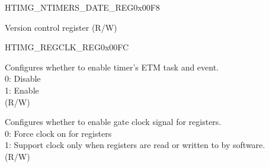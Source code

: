 \begin{register}{H}{TIMG\_NTIMERS\_DATE\_REG}{0x00F8}\label{regdesc:TIMGNTIMERSDATEREG}
%
%
\regnewline%
\begin{regdesc}\begin{reglist}
\label{fielddesc:TIMGNTIMGSDATE}\item [TIMG\_NTIMGS\_DATE] Version control register (R/W)
\end{reglist}\end{regdesc}
\end{register}


\begin{register}{H}{TIMG\_REGCLK\_REG}{0x00FC}\label{regdesc:TIMGREGCLKREG}
%
%
%
%
\regnewline%
\begin{regdesc}\begin{reglist}
\label{fielddesc:TIMGETMEN}\item [TIMG\_ETM\_EN] Configures whether to enable timer's ETM task and event. \\
0: Disable \\
1: Enable \\
(R/W)
\label{fielddesc:TIMGCLKEN}\item [TIMG\_CLK\_EN] Configures whether to enable gate clock signal for registers. \\
0: Force clock on for registers \\
1: Support clock only when registers are read or written to by software. \\
(R/W)
\end{reglist}\end{regdesc}
\end{register}
